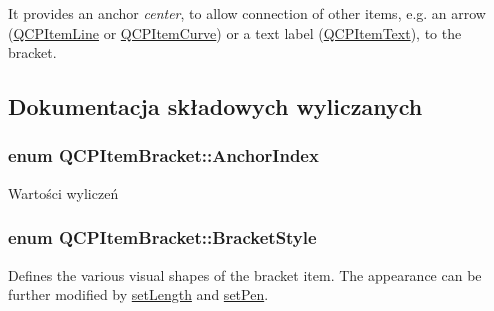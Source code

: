 It provides an anchor {\itshape center}, to allow connection of other items, e.\+g. an arrow (\hyperlink{class_q_c_p_item_line}{Q\+C\+P\+Item\+Line} or \hyperlink{class_q_c_p_item_curve}{Q\+C\+P\+Item\+Curve}) or a text label (\hyperlink{class_q_c_p_item_text}{Q\+C\+P\+Item\+Text}), to the bracket. 

\subsection{Dokumentacja składowych wyliczanych}
\subsubsection[{\texorpdfstring{Anchor\+Index}{AnchorIndex}}]{\setlength{\rightskip}{0pt plus 5cm}enum {\bf Q\+C\+P\+Item\+Bracket\+::\+Anchor\+Index}\hspace{0.3cm}{\ttfamily [protected]}}\hypertarget{class_q_c_p_item_bracket_a7f3a6a56d67f71219ed220553f3dd861}{}\label{class_q_c_p_item_bracket_a7f3a6a56d67f71219ed220553f3dd861}
\begin{Desc}
\item[Wartości wyliczeń]\par
\begin{description}
\item[{\em 
ai\+Center\hypertarget{class_q_c_p_item_bracket_a7f3a6a56d67f71219ed220553f3dd861a17b57ef34cc05eadfe9becd1ad5b5242}{}\label{class_q_c_p_item_bracket_a7f3a6a56d67f71219ed220553f3dd861a17b57ef34cc05eadfe9becd1ad5b5242}
}]\end{description}
\end{Desc}
\subsubsection[{\texorpdfstring{Bracket\+Style}{BracketStyle}}]{\setlength{\rightskip}{0pt plus 5cm}enum {\bf Q\+C\+P\+Item\+Bracket\+::\+Bracket\+Style}}\hypertarget{class_q_c_p_item_bracket_a7ac3afd0b24a607054e7212047d59dbd}{}\label{class_q_c_p_item_bracket_a7ac3afd0b24a607054e7212047d59dbd}
Defines the various visual shapes of the bracket item. The appearance can be further modified by \hyperlink{class_q_c_p_item_bracket_ac7cfc3da7da9b5c5ac5dfbe4f0351b2a}{set\+Length} and \hyperlink{class_q_c_p_item_bracket_ab13001d9cc5d8f9e56ea15bdda682acb}{set\+Pen}.


